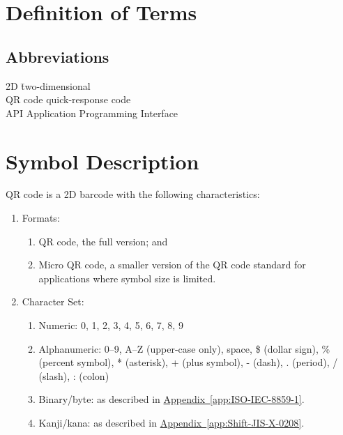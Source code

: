 \documentclass[../../2_codex]{subfiles}
\begin{document}
\section{Definition of Terms}

\subsection{Abbreviations}

\begin{tabbing}
  2D \hspace{3em} \= two-dimensional \parencite{mw-2d} \\
  QR code \> quick-response code \parencite{wikipedia-qr} \\
  API \> Application Programming Interface \parencite{wikipedia-api} \\
\end{tabbing}

\section{Symbol Description}

QR code is a 2D barcode with the following characteristics:

\begin{enumerate}
  \item Formats:
    \begin{enumerate}[label=\alph*.]
      \item QR code, the full version; and
      \item Micro QR code, a smaller version of the QR code standard for applications where symbol size is limited.
    \end{enumerate}
  \item Character Set\parencite{wikipedia-qr}:
    \begin{enumerate}[label=\alph*.]
      \item Numeric: 0, 1, 2, 3, 4, 5, 6, 7, 8, 9
      \item Alphanumeric: 0--9, A--Z (upper-case only), space, \$ (dollar sign), \% (percent symbol), * (asterisk), + (plus symbol), - (dash), . (period), / (slash), : (colon) 
      \item Binary/byte:  as described in \hyperref[app:ISO-IEC-8859-1]{Appendix~\ref*{app:ISO-IEC-8859-1}}.
      \item Kanji/kana:  as described in \hyperref[app:Shift-JIS-X-0208]{Appendix~\ref*{app:Shift-JIS-X-0208}}.
    \end{enumerate}
\end{enumerate}
\end{document}
